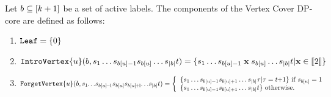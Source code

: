 \begin{definition} \label{VCDP-core}
Let $b \subseteq [k+1]$ be a set of active labels. The components of the {\sc Vertex Cover} DP-core are defined as follows:
\begin{enumerate}
\item \label{VCDP-coreLeaf}$\texttt{Leaf} = \{0\}$

\item \label{VCDP-coreIntroVertex}$\texttt{IntroVertex}\{u\}(b,s_1\dots s_{b[u]-1}s_{b[u]}\dots s_{|b|} t) \\= \{s_1\dots s_{b[u]-1}\thickspace\textbf{x}\thickspace s_{b[u]}\dots s_{|b|} t | \textbf{x} \in \llbracket 2 \rrbracket\}$

\item \label{VCDP-coreForgetVertex}$\forgetvertex{\activelabelu}(\activelabels,s_1\negthickspace\dots\negthinspace s_{\activelabels[\activelabelu]\negthinspace-\negthinspace1}s_{\activelabels[\activelabelu]}s_{\activelabels[\activelabelu]\negthinspace+\negthinspace1}\negthickspace\dots\negthinspace s_{|\activelabels|} t) \\ = 
\left\{\begin{array}{l}
\{s_1\dots s_{\activelabels[\activelabelu]-1}s_{\activelabels[\activelabelu]+1}\dots s_{|\activelabels|} \tau | \tau = t\negthickspace+\negmedspace1\} \mbox{ if $s_{\activelabels[\activelabelu]} = 1$} \\ 
\{s_1\dots s_{\activelabels[\activelabelu]-1}s_{\activelabels[\activelabelu]+1}\dots s_{|\activelabels|} t\} \mbox{ otherwise.} 
\end{array}\right. $


\end{enumerate}
\end{definition}
